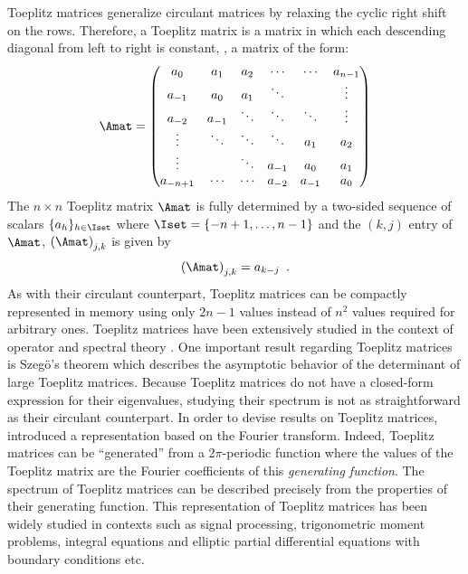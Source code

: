 Toeplitz matrices generalize circulant matrices by relaxing the cyclic right shift on the rows.
Therefore, a Toeplitz matrix is a matrix in which each descending diagonal from left to right is constant, \ie, a matrix of the form:
\begin{equation}
  \Amat =
  \leftmatrix
    a_0      & a_1    & a_{2}  & \cdots & \cdots & a_{n-1} \\
    a_{-1}   & a_0    & a_{1}  & \ddots &        & \vdots  \\
    a_{-2}   & a_{-1} & \ddots & \ddots & \ddots & \vdots  \\
    \vdots   & \ddots & \ddots & \ddots & a_{1}  & a_2     \\
    \vdots   &        & \ddots & a_{-1} & a_{0}  & a_1     \\
    a_{-n+1} & \cdots & \cdots & a_{-2} & a_{-1} & a_0
  \rightmatrix
\end{equation}
\noindent
The $n \times n$ Toeplitz matrix $\Amat$ is fully determined by a two-sided sequence of scalars $\{a_h\}_{h \in \Iset}$ where $\Iset = \{-n+1, \dots, n-1\}$ and the $(k,j)$ entry of $\Amat$, $\leftmat \Amat \rightmat_{j,k}$ is given by
\begin{equation}
  \leftmat \Amat \rightmat_{j,k} = a_{k-j} \enspace.
\end{equation}
\noindent
As with their circulant counterpart, Toeplitz matrices can be compactly represented in memory using only $2n-1$ values instead of $n^2$ values required for arbitrary ones.
Toeplitz matrices have been extensively studied in the context of operator and spectral theory \cite{grenander1958toeplitz,widom1965toeplitz,bottcher2012introduction}.
One important result regarding Toeplitz matrices is Szeg\"{o}'s theorem \cite{szego1915grenzwertsatz} which describes the asymptotic behavior of the determinant of large Toeplitz matrices.
Because Toeplitz matrices do not have a closed-form expression for their eigenvalues, studying their spectrum is not as straightforward as their circulant counterpart.
In order to devise results on Toeplitz matrices, \citet{grenander1958toeplitz} introduced a representation based on the Fourier transform.
Indeed, Toeplitz matrices can be ``generated'' from a 2$\pi$-periodic function where the values of the Toeplitz matrix are the Fourier coefficients of this \emph{generating function}.
The spectrum of Toeplitz matrices can be described precisely from the properties of their generating function.
This representation of Toeplitz matrices has been widely studied in contexts such as signal processing, trigonometric moment problems, integral equations and elliptic partial differential equations with boundary conditions etc. \cite{serra1997extension,parter1961extreme,avram1988bilinear,widom1965toeplitz,tilli1997asymptotic,tyrtyshnikov1998spectra,tilli1998singular,tilli1997asymptotic} 



